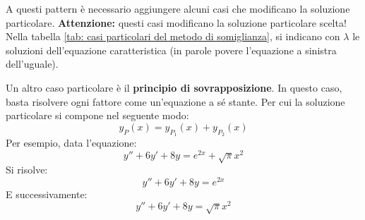 \documentclass[a4paper]{article}
\begin{document}
	\noindent
	A questi pattern è necessario aggiungere alcuni casi che modificano la soluzione particolare. \textbf{Attenzione:} questi casi modificano la soluzione particolare scelta! Nella tabella \ref{tab: casi particolari del metodo di somiglianza}, si indicano con $\lambda$ le soluzioni dell'equazione caratteristica (in parole povere l'equazione a sinistra dell'uguale).\newline

	\noindent
	Un altro caso particolare è il \textbf{principio di sovrapposizione}. In questo caso, basta risolvere ogni fattore come un'equazione a sé stante. Per cui la soluzione particolare si compone nel seguente modo:
	\begin{equation*}
		y_{P}\left(x\right) = y_{P_{1}}\left(x\right) + y_{P_{2}}\left(x\right)
	\end{equation*}
	Per esempio, data l'equazione:
	\begin{equation*}
		y'' + 6y' + 8y = e^{2x} + \sqrt{\pi} x^{2}
	\end{equation*}
	Si risolve:
	\begin{equation*}
		y'' + 6y' + 8y = e^{2x}
	\end{equation*}
	E successivamente:
	\begin{equation*}
		y'' + 6y' + 8y = \sqrt{\pi} x^{2}
	\end{equation*}\newpage
\end{document}
